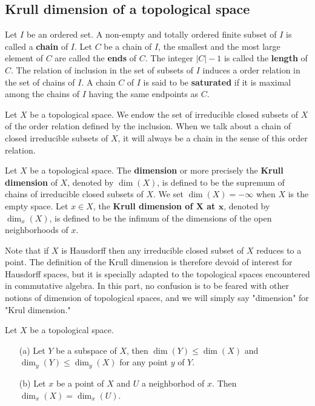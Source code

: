 \subsection{Krull dimension of a topological space}
\begin{definition}
Let $I$ be an ordered set. A non-empty and totally ordered finite subset of $I$ is called a \textbf{chain} of $I$. Let $C$ be a chain of $I$, the smallest and the most large element of $C$ are called the \textbf{ends} of $C$. The integer $|C|-1$ is called the \textbf{length} of $C$. The relation of inclusion in the set of subsets of $I$ induces a order relation in the set of chains of $I$. A chain $C$ of $I$ is said to be \textbf{saturated} if it is maximal among the chains of $I$ having the same endpoints as $C$.
\end{definition}
Let $X$ be a topological space. We endow the set of irreducible closed subsets of $X$ of the order relation defined by the inclusion. When we talk about a chain of closed irreducible subsets of $X$, it will always be a chain in the sense of this order relation.
\begin{definition}
Let $X$ be a topological space. The \textbf{dimension} or more precisely the \textbf{Krull dimension} of $X$, denoted by $\dim(X)$, is defined to be the supremum of chains of irreducible closed subsets of $X$. We set $\dim(X)=-\infty$ when $X$ is the empty space. Let $x\in X$, the \textbf{Krull dimension of $\bm{X}$ at $\bm{x}$}, denoted by $\dim_x(X)$, is defined to be the infimum of the dimensions of the open neighborhoods of $x$.
\end{definition}
Note that if $X$ is Hausdorff then any irreducible closed subset of $X$ reduces to a point. The definition of the Krull dimension is therefore devoid of interest for Hausdorff spaces, but it is specially adapted to the topological spaces encountered in commutative algebra. In this part, no confusion is to be feared with other notions of dimension of topological spaces, and we will simply say "dimension" for "Krul dimension."
\begin{proposition}\label{topo space Krull dimension prop}
Let $X$ be a topological space.
\begin{itemize}
\item[(a)] Let $Y$ be a subspace of $X$, then $\dim(Y)\leq\dim(X)$ and $\dim_y(Y)\leq\dim_y(X)$ for any point $y$ of $Y$.
\item[(b)] Let $x$ be a point of $X$ and $U$ a neighborhod of $x$. Then $\dim_x(X)=\dim_x(U)$.
\end{itemize}
\end{proposition}
